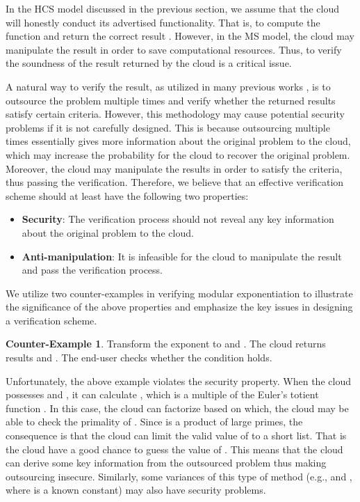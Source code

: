 \documentclass[english,draftcls,onecolumn,11pt]{IEEEtran}
\theoremstyle{definition}
\theoremstyle{plain}
\theoremstyle{plain}
\theoremstyle{definition}
\newtheorem{ctexample}{Counter-Example}
\begin{document}
In the HCS model discussed in the previous section, we assume that
the cloud will honestly conduct its advertised functionality. That
is, to compute the function  and return the correct
result . However, in the MS model, the cloud may manipulate
the result in order to save computational resources. Thus, to verify
the soundness of the result returned by the cloud is a critical issue.

A natural way to verify the result, as utilized in many previous works
\cite{chen2012new,chen2014efficient,hohenberger2005securely}, is
to outsource the problem multiple times and verify whether the returned
results satisfy certain criteria. However, this methodology may cause
potential security problems if it is not carefully designed. This
is because outsourcing multiple times essentially gives more information
about the original problem to the cloud, which may increase the probability
for the cloud to recover the original problem. Moreover, the cloud
may manipulate the results in order to satisfy the criteria, thus
passing the verification. Therefore, we believe that an effective
verification scheme should at least have the following two properties: 
\begin{itemize}
\item \textbf{Security}: The verification process should not reveal any
key information about the original problem to the cloud. 
\item \textbf{Anti-manipulation}: It is infeasible for the cloud to manipulate
the result and pass the verification process. 
\end{itemize}
We utilize two counter-examples in verifying modular exponentiation
to illustrate the significance of the above properties and emphasize
the key issues in designing a verification scheme. 

\begin{ctexample}
Transform the exponent   to  and . The cloud returns results  and . The end-user checks whether the condition   holds.  
\end{ctexample}

Unfortunately, the above example violates the security property. When
the cloud possesses  and , it can calculate ,
which is a multiple of the Euler's totient function . In
this case, the cloud can factorize  based on
which, the cloud may be able to check the primality of . Since
 is a product of large primes, the consequence is that the cloud
can limit the valid value of  to a short list. That is the cloud
have a good chance to guess the value of . This means that the
cloud can derive some key information from the outsourced problem
thus making outsourcing insecure. Similarly, some variances of this
type of method (e.g.,  and ,
where  is a known constant) may also have security problems.
\end{document}
